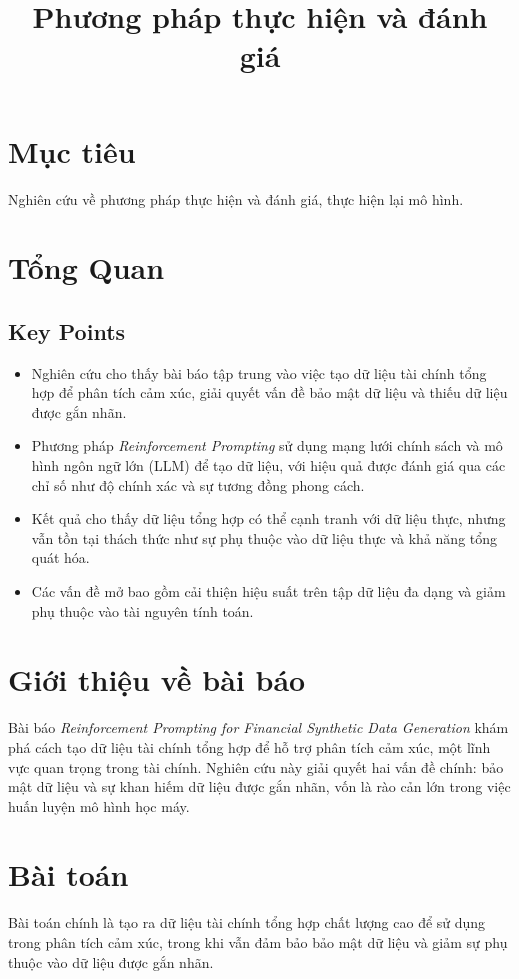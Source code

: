 \documentclass[a4paper,12pt]{article}
\title{Phương pháp thực hiện và đánh giá}
\author{}
\date{}
\begin{document}
\maketitle

\section{Mục tiêu}
Nghiên cứu về phương pháp thực hiện và đánh giá, thực hiện lại mô hình.

\section{Tổng Quan}
\subsection{Key Points}
\begin{itemize}
    \item Nghiên cứu cho thấy bài báo tập trung vào việc tạo dữ liệu tài chính tổng hợp để phân tích cảm xúc, giải quyết vấn đề bảo mật dữ liệu và thiếu dữ liệu được gắn nhãn.
    \item Phương pháp \textit{Reinforcement Prompting} sử dụng mạng lưới chính sách và mô hình ngôn ngữ lớn (LLM) để tạo dữ liệu, với hiệu quả được đánh giá qua các chỉ số như độ chính xác và sự tương đồng phong cách.
    \item Kết quả cho thấy dữ liệu tổng hợp có thể cạnh tranh với dữ liệu thực, nhưng vẫn tồn tại thách thức như sự phụ thuộc vào dữ liệu thực và khả năng tổng quát hóa.
    \item Các vấn đề mở bao gồm cải thiện hiệu suất trên tập dữ liệu đa dạng và giảm phụ thuộc vào tài nguyên tính toán.
\end{itemize}

\section{Giới thiệu về bài báo}
Bài báo \textit{Reinforcement Prompting for Financial Synthetic Data Generation} khám phá cách tạo dữ liệu tài chính tổng hợp để hỗ trợ phân tích cảm xúc, một lĩnh vực quan trọng trong tài chính. Nghiên cứu này giải quyết hai vấn đề chính: bảo mật dữ liệu và sự khan hiếm dữ liệu được gắn nhãn, vốn là rào cản lớn trong việc huấn luyện mô hình học máy.

\section{Bài toán}
Bài toán chính là tạo ra dữ liệu tài chính tổng hợp chất lượng cao để sử dụng trong phân tích cảm xúc, trong khi vẫn đảm bảo bảo mật dữ liệu và giảm sự phụ thuộc vào dữ liệu được gắn nhãn.
\end{document}

